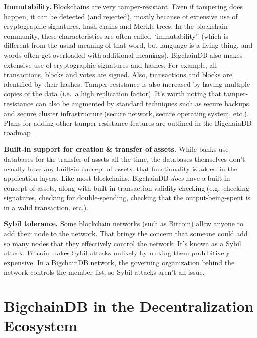 \documentclass[a4paper]{article}
\begin{document}
\vspace{1 em}

\noindent \textbf{Immutability.}
Blockchains are very tamper-resistant.
Even if tampering does happen, it can be detected
(and rejected),
mostly because of extensive use of cryptographic signatures,
hash chains and Merkle trees.
In the blockchain community,
these characteristics are often called ``immutability''
(which is different from the usual meaning of that word,
but language is a living thing,
and words often get overloaded with additional meanings).
BigchainDB also makes extensive use
of cryptographic signatures and hashes.
For example, all transactions,
blocks and votes are signed.
Also, transactions and blocks are identified
by their hashes.
Tamper-resistance is also increased
by having multiple copies of the data
(i.e.~a high replication factor).
It's worth noting that tamper-resistance can also be augmented
by standard techniques such as secure backups
and secure cluster infrastructure (secure network, secure operating system, etc.).
Plans for adding other tamper-resistance features
are outlined in the BigchainDB roadmap~\cite{bigchaindb_roadmap}.

\vspace{1 em}

\noindent \textbf{Built-in support for creation \& transfer of assets.}
While banks use databases for the transfer of assets all the time,
the databases themselves don't usually have any built-in concept of assets:
that functionality is added in the application layers.
Like most blockchains,
BigchainDB \emph{does} have a built-in concept of assets,
along with built-in
transaction validity checking
(e.g.~checking signatures,
checking for double-spending,
checking that the output-being-spent is in a valid transaction, etc.).

\vspace{1 em}

\noindent \textbf{Sybil tolerance.}
Some blockchain networks (such as Bitcoin) allow anyone
to add their node to the network.
That brings the concern that someone could add
so many nodes that they effectively control the network.
It's known as a Sybil attack.
Bitcoin makes Sybil attacks unlikely by making them
prohibitively expensive.
In a BigchainDB network,
the governing organization behind the network
controls the member list,
so Sybil attacks aren't an issue.


\section{BigchainDB in the Decentralization \mbox{Ecosystem}}
\end{document}
